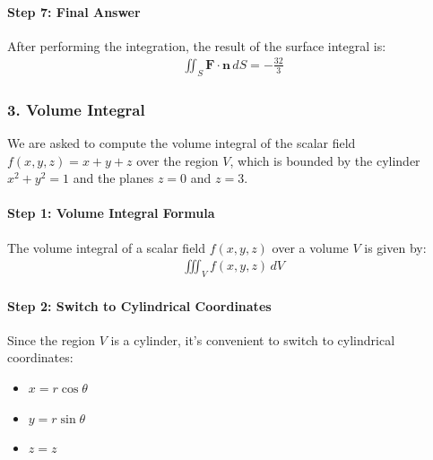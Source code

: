 \documentclass[letterpaper,10pt,english]{jupyterBook}
\begin{document}
\paragraph{Step 7: Final Answer}
\label{\detokenize{prerequisites:step-7-final-answer}}
\sphinxAtStartPar
After performing the integration, the result of the surface integral is:
\begin{equation*}
\begin{split}
\iint_S \mathbf{F} \cdot \mathbf{n} \, dS = -\frac{32}{3}
\end{split}
\end{equation*}

\subsubsection{3. Volume Integral}
\label{\detokenize{prerequisites:volume-integral}}
\sphinxAtStartPar
We are asked to compute the volume integral of the scalar field \( f(x, y, z) = x + y + z \) over the region \( V \), which is bounded by the cylinder \( x^2 + y^2 = 1 \) and the planes \( z = 0 \) and \( z = 3 \).


\paragraph{Step 1: Volume Integral Formula}
\label{\detokenize{prerequisites:step-1-volume-integral-formula}}
\sphinxAtStartPar
The volume integral of a scalar field \( f(x, y, z) \) over a volume \( V \) is given by:
\begin{equation*}
\begin{split}
\iiint_V f(x, y, z) \, dV
\end{split}
\end{equation*}

\paragraph{Step 2: Switch to Cylindrical Coordinates}
\label{\detokenize{prerequisites:step-2-switch-to-cylindrical-coordinates}}
\sphinxAtStartPar
Since the region \( V \) is a cylinder, it’s convenient to switch to cylindrical coordinates:
\begin{itemize}
\item {} 
\sphinxAtStartPar
\( x = r \cos\theta \)

\item {} 
\sphinxAtStartPar
\( y = r \sin\theta \)

\item {} 
\sphinxAtStartPar
\( z = z \)

\end{itemize}
\end{document}
